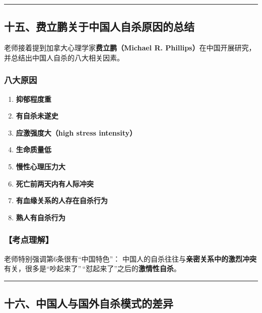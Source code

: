 \documentclass[
  chinese,
  9pt,
  a4paper,
]{ctexart}
\providecommand{\tightlist}{%
  \setlength{\itemsep}{0pt}\setlength{\parskip}{0pt}}
\begin{document}
\begin{center}\rule{0.5\linewidth}{0.5pt}\end{center}

\subsection{十五、费立鹏关于中国人自杀原因的总结}\label{ux5341ux4e94ux8d39ux7acbux9e4fux5173ux4e8eux4e2dux56fdux4ebaux81eaux6740ux539fux56e0ux7684ux603bux7ed3}

老师接着提到加拿大心理学家\textbf{费立鹏（Michael R.
Phillips）}在中国开展研究，并总结出中国人自杀的八大相关因素。

\subsubsection{八大原因}\label{ux516bux5927ux539fux56e0}

\begin{enumerate}
\def\labelenumi{\arabic{enumi}.}
\tightlist
\item
  \textbf{抑郁程度重}
\item
  \textbf{有自杀未遂史}
\item
  \textbf{应激强度大（high stress intensity）}
\item
  \textbf{生命质量低}
\item
  \textbf{慢性心理压力大}
\item
  \textbf{死亡前两天内有人际冲突}
\item
  \textbf{有血缘关系的人存在自杀行为}
\item
  \textbf{熟人有自杀行为}
\end{enumerate}

\subsubsection{【考点理解】}\label{ux8003ux70b9ux7406ux89e3}

老师特别强调第6条很有``中国特色''：
中国人的自杀往往与\textbf{亲密关系中的激烈冲突}有关，很多是``吵起来了''\,``怼起来了''之后的\textbf{激情性自杀}。

\begin{center}\rule{0.5\linewidth}{0.5pt}\end{center}

\subsection{十六、中国人与国外自杀模式的差异}\label{ux5341ux516dux4e2dux56fdux4ebaux4e0eux56fdux5916ux81eaux6740ux6a21ux5f0fux7684ux5deeux5f02}
\end{document}
